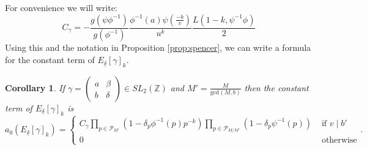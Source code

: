 \documentclass{amsart}
\theoremstyle{plain}
\newtheorem{corollary}[theorem]{Corollary}
\theoremstyle{definition}
\newcommand*{\field}[1]{\mathbb{#1}}
\begin{document}
For convenience we will write:
\begin{equation*}
    C_{\gamma}=-\frac{g(\psi\phi^{-1})}{g(\phi^{-1})}\frac{\phi^{-1}(a) \psi\left(\frac{-b}{v}\right)}{u^k }\frac{L(1-k, \psi^{-1}\phi)}{2}
\end{equation*}
Using this and the notation in Proposition \ref{prop:spencer}, we can write a formula for the constant term of $E_{\underline{\delta}}[\gamma]_k$.
\begin{corollary}
\label{cor:cusp}
If $\gamma = \left(\begin{smallmatrix} a & \beta \\ b & \delta \end{smallmatrix}\right) \in SL_2(\field{Z})$ and $M' = \frac{M}{\text{gcd}(M,b)}$ then the constant term of $E_{\underline{\delta}}[\gamma]_k$ is
\begin{equation*}
    a_0(E_{\underline{\delta}}[\gamma]_k) = \begin{cases}C_{\gamma} \prod_{p\in \mathcal{P}_{M'}}(1 - \delta_p \phi^{-1}(p)p^{-k})\prod_{p \in \mathcal{P}_{M/M'}} (1 - \delta_p \psi^{-1}(p))  & \text{ if } v\mid b'\\ 0& \text{ otherwise}\end{cases}.
\end{equation*}
\end{corollary}
\end{document}
